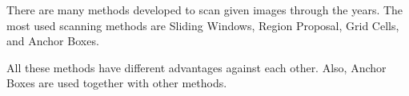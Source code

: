 \documentclass{article}
\begin{document}
\setlength{\parindent}{6ex}
\indent

There are many methods developed to scan given images through the years.
The most used scanning methods are Sliding Windows, Region Proposal, 
Grid Cells, and Anchor Boxes. \par

All these methods have different advantages against each other. Also, 
Anchor Boxes are used together with other methods.
\end{document}
